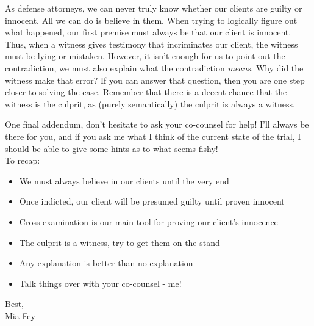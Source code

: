 \documentclass{article}
\begin{document}
As defense attorneys, we can never truly know whether our clients are guilty or innocent. All we can do is believe in them. When trying to logically figure out what happened, our first premise must always be that our client is innocent. Thus, when a witness gives testimony that incriminates our client, the witness must be lying or mistaken. However, it isn't enough for us to point out the contradiction, we must also explain what the contradiction \textit{means}. Why did the witness make that error? If you can answer that question, then you are one step closer to solving the case. Remember that there is a decent chance that the witness is the culprit, as (purely semantically) the culprit is always a witness. 

One final addendum, don't hesitate to ask your co-counsel for help! I'll always be there for you, and if you ask me what I think of the current state of the trial, I should be able to give some hints as to what seems fishy!\\


To recap:
\begin{itemize}
\item We must always believe in our clients until the very end
\item Once indicted, our client will be presumed guilty until proven innocent
\item Cross-examination is our main tool for proving our client's innocence
\item The culprit is a witness, try to get them on the stand
\item Any explanation is better than no explanation
\item Talk things over with your co-counsel - me!
\end{itemize} 

Best,\\

Mia Fey
\end{document}
